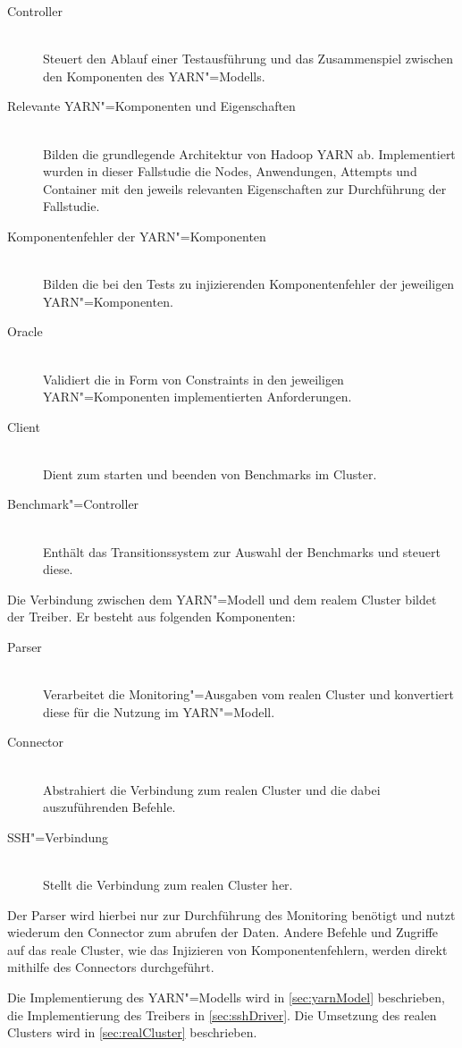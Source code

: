 \begin{description}
    \item [Controller] \hfill \\
        Steuert den Ablauf einer Testausführung und das Zusammenspiel zwischen den Komponenten des \ac{YARN}"=Modells.
    \item [Relevante \ac{YARN}"=Komponenten und Eigenschaften] \hfill \\
        Bilden die grundlegende Architektur von Hadoop \ac{YARN} ab.
        Implementiert wurden in dieser Fallstudie die Nodes, Anwendungen, Attempts und Container mit den jeweils relevanten Eigenschaften zur Durchführung der Fallstudie.
    \item [Komponentenfehler der \ac{YARN}"=Komponenten] \hfill \\
        Bilden die bei den Tests zu injizierenden Komponentenfehler der jeweiligen \ac{YARN}"=Komponenten.
    \item [Oracle] \hfill \\
        Validiert die in Form von Constraints in den jeweiligen \ac{YARN}"=Komponenten implementierten Anforderungen.
    \item [Client] \hfill \\
        Dient zum starten und beenden von Benchmarks im Cluster.
    \item [Benchmark"=Controller] \hfill \\
        Enthält das Transitionssystem zur Auswahl der Benchmarks und steuert diese.
\end{description}

Die Verbindung zwischen dem \ac{YARN}"=Modell und dem realem Cluster bildet der Treiber.
Er besteht aus folgenden Komponenten:

\begin{description}
    \item [Parser] \hfill \\
        Verarbeitet die Monitoring"=Ausgaben vom realen Cluster und konvertiert diese für die Nutzung im \ac{YARN}"=Modell.
    \item [Connector] \hfill \\
        Abstrahiert die Verbindung zum realen Cluster und die dabei auszuführenden Befehle.
    \item [SSH"=Verbindung]  \hfill \\
        Stellt die Verbindung zum realen Cluster her.
\end{description}

Der Parser wird hierbei nur zur Durchführung des Monitoring benötigt und nutzt wiederum den Connector zum abrufen der Daten.
Andere Befehle und Zugriffe auf das reale Cluster, wie \zB das Injizieren von Komponentenfehlern, werden direkt mithilfe des Connectors durchgeführt.

Die Implementierung des \ac{YARN}"=Modells wird in \cref{sec:yarnModel} beschrieben, die Implementierung des Treibers in \cref{sec:sshDriver}.
Die Umsetzung des realen Clusters wird in \cref{sec:realCluster} beschrieben.
